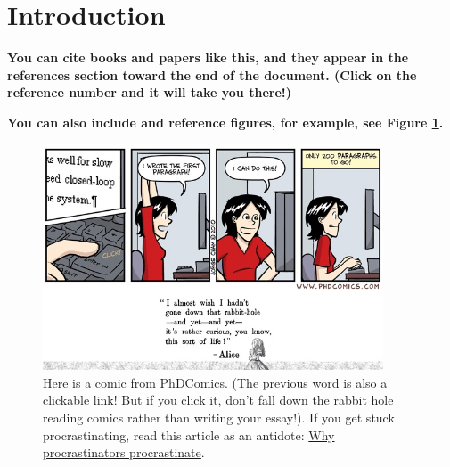 \section{Introduction}
 
\textbf{You can cite books \cite{Feynman1998} and papers \cite{Lee2016} like this, and they appear in the references section toward the end of the document. (Click on the reference number and it will take you there!)}

\lipsum[5-7] %

\textbf{You can also include and reference figures, for example, see Figure \ref{fig:example}.}
 
\begin{figure}[htbp]
    \centering
    \includegraphics[width=0.9\textwidth]{./images/phd022410s.jpg}
    \caption{Here is a comic from \href{http://phdcomics.com/comics/archive.php?comicid=1285}{PhDComics}. (The previous word is also a clickable link! But if you click it, don't fall down the rabbit hole reading comics rather than writing your essay!). If you get stuck procrastinating, read this article as an antidote: \href{https://www.waitbutwhy.com/2013/10/why-procrastinators-procrastinate.html}{Why procrastinators procrastinate}. }
    \label{fig:example}
\end{figure}

